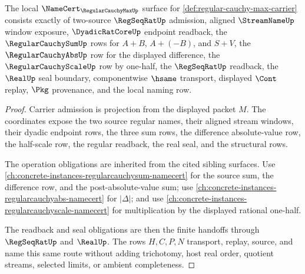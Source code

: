\begin{theorem}
\label{thm:regular-cauchy-max-namecert-obligations}
The local $\NameCert_{\RegularCauchyMaxUp}$ surface for \autoref{def:regular-cauchy-max-carrier} consists exactly of two-source $\RegSeqRatUp$ admission, aligned $\StreamNameUp$ window exposure, $\DyadicRatCoreUp$ endpoint readback, the $\RegularCauchySumUp$ rows for $A+B$, $A+(-B)$, and $S+V$, the $\RegularCauchyAbsUp$ row for the displayed difference, the $\RegularCauchyScaleUp$ row by one-half, the $\RegSeqRatUp$ readback, the $\RealUp$ seal boundary, componentwise $\hsame$ transport, displayed $\Cont$ replay, $\Pkg$ provenance, and the local naming row.
\end{theorem}
\begin{proof}
Carrier admission is projection from the displayed packet $M$. The coordinates expose the two source regular names, their aligned stream windows, their dyadic endpoint rows, the three sum rows, the difference absolute-value row, the half-scale row, the regular readback, the real seal, and the structural rows.

The operation obligations are inherited from the cited sibling surfaces. Use \autoref{ch:concrete-instances-regularcauchysum-namecert} for the source sum, the difference row, and the post-absolute-value sum; use \autoref{ch:concrete-instances-regularcauchyabs-namecert} for $|\Delta|$; and use \autoref{ch:concrete-instances-regularcauchyscale-namecert} for multiplication by the displayed rational one-half.

The readback and seal obligations are then the finite handoffs through $\RegSeqRatUp$ and $\RealUp$. The rows $H,C,P,N$ transport, replay, source, and name this same route without adding trichotomy, host real order, quotient streams, selected limits, or ambient completeness.
\end{proof}


